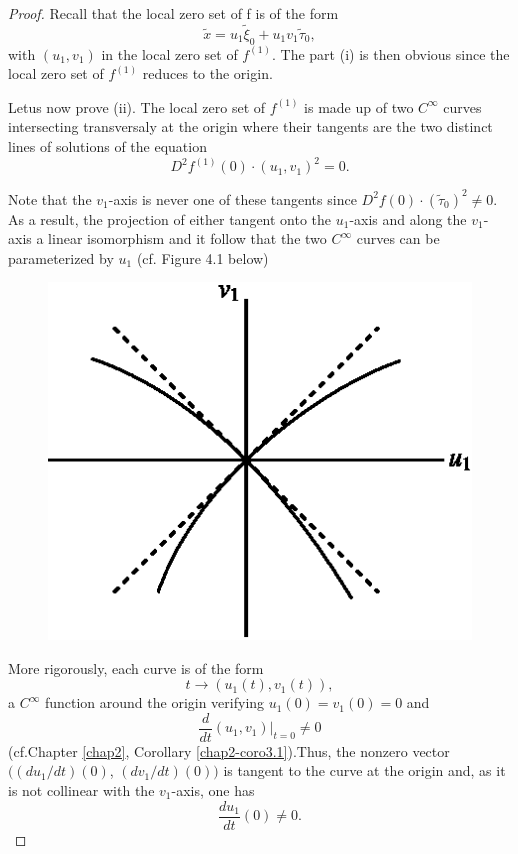 \begin{proof}
Recall that the local zero set of f is of the form
$$
\widetilde{x} = u_{1}\widetilde{\xi}_{0} + u_{1}v_{1}\widetilde{\tau}_{0},
$$
with $(u_{1}, v_{1})$ in the local zero set of $f^{(1)}$. The part (i)
is then obvious since the local zero set of $f^{(1)}$ reduces to the
origin.

Let\pageoriginale us now prove (ii). The local zero set of $f^{(1)}$
is made up of two $C^{\infty}$ curves intersecting transversaly at the
origin where their tangents are the two distinct lines of solutions of
the equation
$$
D^{2}f^{(1)}(0) \cdot (u_{1}, v_{1})^{2} = 0.
$$

Note that the $v_{1}$-axis is never one of these tangents since
$D^{2}f(0) \cdot (\widetilde{\tau}_{0})^{2} \neq 0$. As a result, the
projection of either tangent onto the $u_{1}$-axis and along the
$v_{1}$-axis a linear isomorphism and it follow that the two
$C^{\infty}$ curves can be parameterized by $u_{1}$ (cf. Figure 4.1
below)
\setcounter{figure}{0}
\begin{figure}[H]
\centering
\includegraphics{figure/fig76-4.1.eps}
\caption{}
\end{figure}

More rigorously, each curve is of the form
\begin{equation*}
t \to (u_{1}(t), v_{1}(t)),\tag{4.14}\label{chap5-eq4.14}
\end{equation*}
a $C^{\infty}$ function around the origin verifying $u_{1}(0) =
v_{1}(0) = 0$ and 
$$
\frac{d}{dt} (u_{1}, v_{1}) |_{t=0} \neq 0
$$
(cf.Chapter \ref{chap2},  Corollary
\ref{chap2-coro3.1}).\pageoriginale Thus, the nonzero vector $((du_{1}/dt)(0)$,
$(dv_{1} / dt)(0))$ is tangent to the curve at the origin and, as it is
not collinear with the $v_{1}$-axis, one has
$$
\frac{du_{1}}{dt} (0) \neq 0.
$$


\end{proof}
